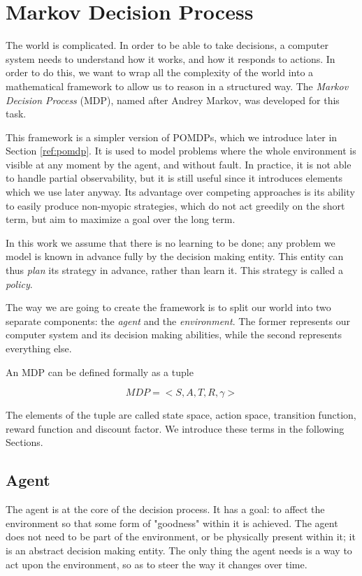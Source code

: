 
\section{Markov Decision Process}\label{ref:mdp}

The world is complicated. In order to be able to take decisions, a computer system needs to
understand how it works, and how it responds to actions. In order to do this, we want to wrap all the
complexity of the world into a mathematical framework to allow us to reason in a structured way. The
\textit{Markov Decision Process} (MDP), named after Andrey Markov, was developed for this task.

This framework is a simpler version of POMDPs, which we introduce later in Section \ref{ref:pomdp}.
It is used to model problems where the whole environment is visible at any moment by the agent, and
without fault. In practice, it is not able to handle partial observability, but it is still useful
since it introduces elements which we use later anyway. Its advantage over competing approaches is
its ability to easily produce non-myopic strategies, which do not act greedily on the short term,
but aim to maximize a goal over the long term.

In this work we assume that there is no learning to be done; any problem we model is known in
advance fully by the decision making entity. This entity can thus \textit{plan} its strategy in
advance, rather than learn it. This strategy is called a \textit{policy}.

The way we are going to create the framework is to split our world into two separate components: the
\textit{agent} and the \textit{environment}. The former represents our computer system and its
decision making abilities, while the second represents everything else.

An MDP can be defined formally as a tuple

\[ MDP = <S,A,T,R,\gamma> \]

The elements of the tuple are called state space, action space, transition function, reward function
and discount factor. We introduce these terms in the following Sections.

\subsection{Agent}

The agent is at the core of the decision process. It has a goal: to affect the environment so that
some form of "goodness" within it is achieved. The agent does not need to be part of the
environment, or be physically present within it; it is an abstract decision making entity. The only
thing the agent needs is a way to act upon the environment, so as to steer the way it changes
over time.

